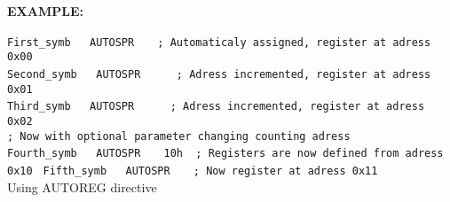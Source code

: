             \textbf{EXAMPLE:}\\
                    \begin{code}[h!]
                    \mysmallfont{}
                            {\color{highlight_symbol}\verb'First_symb'}\verb'   '{\color{highlight_directive}\verb'AUTOSPR'}\verb'   '
                            {\color{highlight_comment}\verb'; Automaticaly assigned, register at adress 0x00'}\\
                            {\color{highlight_symbol}\verb'Second_symb'}\verb'   '{\color{highlight_directive}\verb'AUTOSPR'}\verb'   '
                            \verb'  '{\color{highlight_comment}\verb'; Adress incremented, register at adress 0x01 '}\\
                            {\color{highlight_symbol}\verb'Third_symb'}\verb'   '{\color{highlight_directive}\verb'AUTOSPR'}\verb'   '
                            \verb'  '{\color{highlight_comment}\verb'; Adress incremented, register at adress 0x02 '}\\
                            {\color{highlight_comment}\verb'; Now with optional parameter changing counting adress '}\\
                            {\color{highlight_symbol}\verb'Fourth_symb'}\verb'   '{\color{highlight_directive}\verb'AUTOSPR'}\verb'   '
                            {\color{highlight_symbol}\verb'10h'}\verb'  '{\color{highlight_comment}\verb'; Registers are now defined from adress 0x10 '}
                            {\color{highlight_symbol}\verb'Fifth_symb'}\verb'   '{\color{highlight_directive}\verb'AUTOSPR'}\verb'   '
                            {\color{highlight_comment}\verb'; Now register at adress 0x11'}\\
                    \caption{Using AUTOREG directive}
                \end{code}

